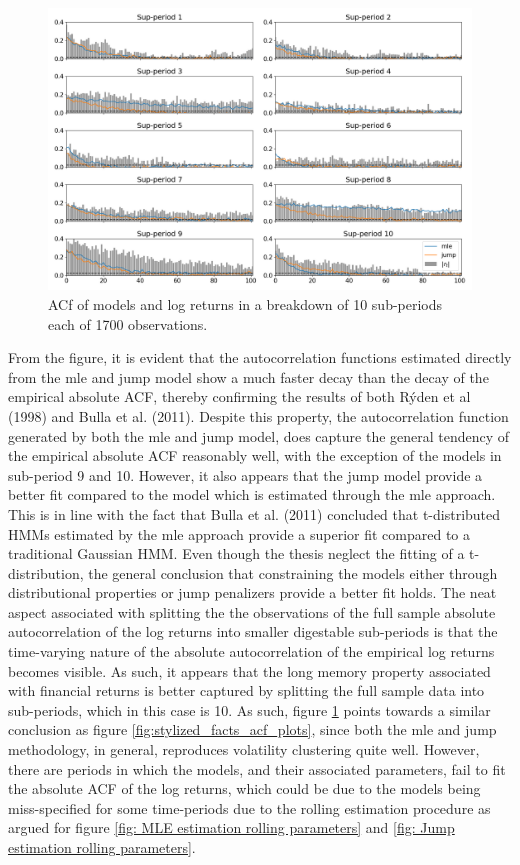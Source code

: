 \begin{figure}[H] 
    \centering
    \includegraphics[width=1.0\textwidth]{analysis/stylized_facts/images/acf_abs_subperiods.png}
    \caption{ACf of models and log returns in a breakdown of 10 sub-periods each of 1700 observations.}
    \label{fig:stylized_facts_acf_plots_sub_periods} 
\end{figure}

From the figure, it is evident that the autocorrelation functions estimated directly from the mle and jump model show a much faster decay than the decay of the empirical absolute ACF, thereby confirming the results of both Rýden et al (1998) and Bulla et al. (2011). Despite this property, the autocorrelation function generated by both the mle and jump model, does capture the general tendency of the empirical absolute ACF reasonably well, with the exception of the models in sub-period 9 and 10. However, it also appears that the jump model provide a better fit compared to the model which is estimated through the mle approach. This is in line with the fact that Bulla et al. (2011) concluded that t-distributed HMMs estimated by the mle approach provide a superior fit compared to a traditional Gaussian HMM. Even though the thesis neglect the fitting of a t-distribution, the general conclusion that constraining the models either through distributional properties or jump penalizers provide a better fit holds. The neat aspect associated with splitting the the observations of the full sample absolute autocorrelation of the log returns into smaller digestable sub-periods is that the time-varying nature of the absolute autocorrelation of the empirical log returns becomes visible. As such, it appears that the long memory property associated with financial returns is better captured by splitting the full sample data into sub-periods, which in this case is 10. As such, figure \ref{fig:stylized_facts_acf_plots_sub_periods} points towards a similar conclusion as figure \ref{fig:stylized_facts_acf_plots}, since both the mle and jump methodology, in general, reproduces volatility clustering quite well. However, there are periods in which the models, and their associated parameters, fail to fit the absolute ACF of the log returns, which could be due to the models being miss-specified for some time-periods due to the rolling estimation procedure as argued for figure \ref{fig: MLE estimation rolling parameters} and \ref{fig: Jump estimation rolling parameters}. 

